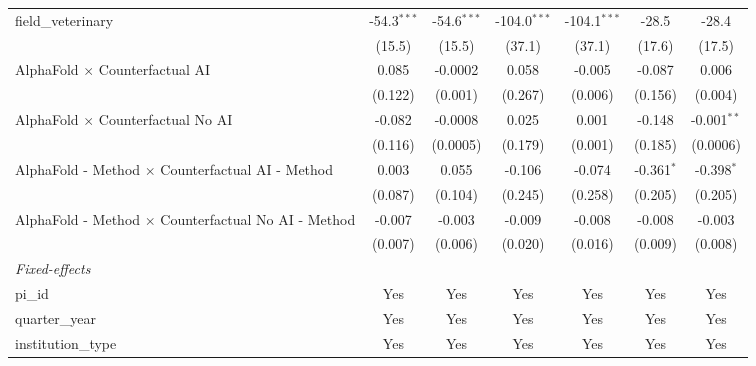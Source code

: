 \begin{tabular}{lcccccc}
   field\_veterinary                                           & -54.3$^{***}$  & -54.6$^{***}$ & -104.0$^{***}$ & -104.1$^{***}$ & -28.5         & -28.4\\   
                                                               & (15.5)         & (15.5)        & (37.1)         & (37.1)         & (17.6)        & (17.5)\\   
   AlphaFold $\times$ Counterfactual AI                        & 0.085          & -0.0002       & 0.058          & -0.005         & -0.087        & 0.006\\   
                                                               & (0.122)        & (0.001)       & (0.267)        & (0.006)        & (0.156)       & (0.004)\\   
   AlphaFold $\times$ Counterfactual No AI                     & -0.082         & -0.0008       & 0.025          & 0.001          & -0.148        & -0.001$^{**}$\\   
                                                               & (0.116)        & (0.0005)      & (0.179)        & (0.001)        & (0.185)       & (0.0006)\\   
   AlphaFold - Method $\times$ Counterfactual AI - Method      & 0.003          & 0.055         & -0.106         & -0.074         & -0.361$^{*}$  & -0.398$^{*}$\\   
                                                               & (0.087)        & (0.104)       & (0.245)        & (0.258)        & (0.205)       & (0.205)\\   
   AlphaFold - Method $\times$ Counterfactual No AI - Method   & -0.007         & -0.003        & -0.009         & -0.008         & -0.008        & -0.003\\   
                                                               & (0.007)        & (0.006)       & (0.020)        & (0.016)        & (0.009)       & (0.008)\\   
   \midrule
   \emph{Fixed-effects}\\
   pi\_id                                                      & Yes            & Yes           & Yes            & Yes            & Yes           & Yes\\  
   quarter\_year                                               & Yes            & Yes           & Yes            & Yes            & Yes           & Yes\\  
   institution\_type                                           & Yes            & Yes           & Yes            & Yes            & Yes           & Yes\\  

\end{tabular}
